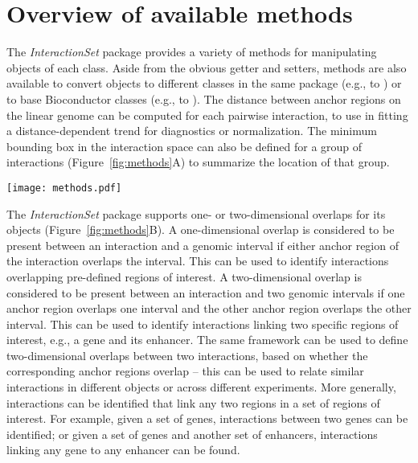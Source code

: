 \documentclass[10pt,a4paper,twocolumn]{article}
\begin{document}
\section*{Overview of available methods}

The \textit{InteractionSet} package provides a variety of methods for manipulating objects of each class.
Aside from the obvious getter and setters, methods are also available to convert objects to different classes in the same package (e.g.,  to ) or to base Bioconductor classes (e.g.,  to ).
The distance between anchor regions on the linear genome can be computed for each pairwise interaction, to use in fitting a distance-dependent trend \cite{aiden2009comprehensive} for diagnostics or normalization.
The minimum bounding box in the interaction space can also be defined for a group of interactions (Figure~\ref{fig:methods}A) to summarize the location of that group.

\begin{figure*}
\centering
\texttt{[image: methods.pdf]}
\caption{Schematic of several methods in the \textit{InteractionSet} package.
(A) Minimum bounding boxes can be identified for groups of interactions, where $u'$, $v'$ and $w'$ belong in one group while $x'$, $y'$ and $z'$ belong in another.
(B) One- or two-dimensional overlaps can be identified between interactions and one or two genomic intervals, respectively. Here, $x'$ and $y'$ have one-dimensional overlaps with the gene and enhancer, respectively, while $z'$ has a two-dimensional overlap with the gene \textit{and} the enhancer.
(C) An  contains data for pairwise interactions across the two-dimensional interaction space.
Given a bait region, a ``cross-section'' of the data can be extracted and converted into a  spanning the linear genome.
}
\label{fig:methods}
\end{figure*}

The \textit{InteractionSet} package supports one- or two-dimensional overlaps for its objects (Figure~\ref{fig:methods}B).
A one-dimensional overlap is considered to be present between an interaction and a genomic interval if either anchor region of the interaction overlaps the interval.
This can be used to identify interactions overlapping pre-defined regions of interest.
A two-dimensional overlap is considered to be present between an interaction and two genomic intervals if one anchor region overlaps one interval and the other anchor region overlaps the other interval.
This can be used to identify interactions linking two specific regions of interest, e.g., a gene and its enhancer.
The same framework can be used to define two-dimensional overlaps between two interactions, based on whether the corresponding anchor regions overlap -- this can be used to relate similar interactions in different  objects or across different experiments.
More generally, interactions can be identified that link any two regions in a set of regions of interest. 
For example, given a set of genes, interactions between two genes can be identified; or given a set of genes and another set of enhancers, interactions linking any gene to any enhancer can be found.
\end{document}
